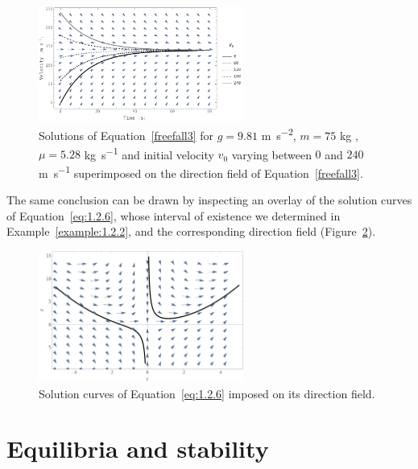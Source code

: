 \begin{figure}
	\begin{center}
			\includegraphics[width=0.6\textwidth]{figures/QualFirst/FreeFall_DF3.png}
	\caption{Solutions of  Equation~\eqref{freefall3} for $g=9.81$ \si{m.s^{-2}}, $m=75$ \si{kg} , $\mu=5.28$ \si{kg.s^{-1}}  and initial velocity $v_0$ varying between $0$ and $240$ \si{m.s^{-1}} superimposed on the direction field of Equation~\eqref{freefall3}.}
	\label{FreeFallDF2}
	\end{center}
\end{figure}

The same conclusion can be drawn by inspecting an overlay of the solution curves of Equation~\eqref{eq:1.2.6}, whose interval of existence we determined in Example~\ref{example:1.2.2}, and the corresponding direction field (Figure~\ref{Example2DF}). 

\begin{figure}
	\begin{center}
			\includegraphics[width=0.6\textwidth]{Example_2_DF.pdf}
	\caption{Solution curves of Equation~\eqref{eq:1.2.6} imposed on its direction field.}
	\label{Example2DF}
	\end{center}
\end{figure}


\section{Equilibria and stability}
\label{equistab}

